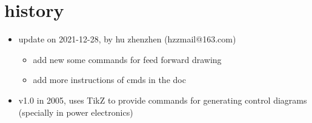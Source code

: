 \documentclass[a4paper,onecolumn]{IEEETran}
\begin{document}
\clearpage

\section{history}

\begin{itemize}
  \item  update on 2021-12-28, by hu zhenzhen (hzzmail@163.com)
    \begin{itemize}
    \item add new some commands for feed forward drawing
    \item add more instructions of cmds in the doc
    \end{itemize}

  \item v1.0 in 2005, uses TikZ to provide commands for generating control diagrams (specially in power electronics)
\end{itemize}
\end{document}
